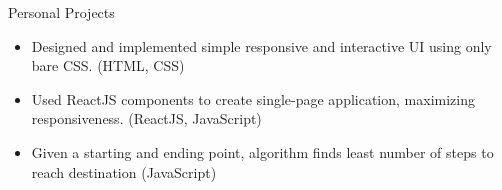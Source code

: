 \documentclass{resume} %
\begin{document}
\begin{workSection}{Personal Projects}
    \customItem[
        title=Personal Portfolio,
        duration=Spring 2023,
        keyHighlight=Built complete portfolio website with ReactJS and bare CSS. See https://ashkan.zone.
    ]
    \begin{itemize}
        \item Designed and implemented simple responsive and interactive UI using only bare CSS. (HTML, CSS)
        \item Used ReactJS components to create single-page application, maximizing responsiveness. (ReactJS, JavaScript)
    \end{itemize}
    \customItem[
        title=Chess Knight Path Finder,
        duration=Spring 2023,
        keyHighlight=Used DFS graph traversal to find the most optimal path for chess knight.
    ]
    \begin{itemize}
        \vspace{-0.5em}
        \itemsep -6pt {}
        \item Given a starting and ending point, algorithm finds least number of steps to reach destination (JavaScript)
    \end{itemize}

\end{workSection}
\end{document}
